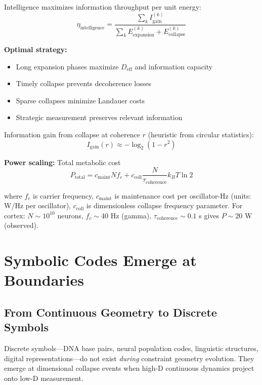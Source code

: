 \documentclass[12pt]{article}
\begin{document}
Intelligence maximizes information throughput per unit energy:
\begin{equation}
\eta_{\text{intelligence}} = \frac{\sum_k I_{\text{gain}}^{(k)}}{\sum_k E_{\text{expansion}}^{(k)} + E_{\text{collapse}}^{(k)}}
\end{equation}

\textbf{Optimal strategy:}
\begin{itemize}
\item Long expansion phases maximize $D_{\text{eff}}$ and information capacity
\item Timely collapse prevents decoherence losses
\item Sparse collapses minimize Landauer costs
\item Strategic measurement preserves relevant information
\end{itemize}

Information gain from collapse at coherence $r$ (heuristic from circular statistics):
\begin{equation}
I_{\text{gain}}(r) \approx -\log_2(1-r^2)
\end{equation}

\textbf{Power scaling:} Total metabolic cost
\begin{equation}
P_{\text{total}} = c_{\text{maint}} N f_c + c_{\text{coll}} \frac{N}{\tau_{\text{coherence}}} k_B T \ln 2
\end{equation}

where $f_c$ is carrier frequency, $c_{\text{maint}}$ is maintenance cost per oscillator-Hz (units: W/Hz per oscillator), $c_{\text{coll}}$ is dimensionless collapse frequency parameter. For cortex: $N \sim 10^{10}$ neurons, $f_c \sim 40$ Hz (gamma), $\tau_{\text{coherence}} \sim 0.1$ s gives $P \sim 20$ W (observed).

\section{Symbolic Codes Emerge at Boundaries}

\subsection{From Continuous Geometry to Discrete Symbols}

Discrete symbols---DNA base pairs, neural population codes, linguistic structures, digital representations---do not exist \textit{during} constraint geometry evolution. They emerge at dimensional collapse events when high-D continuous dynamics project onto low-D measurement.
\end{document}
